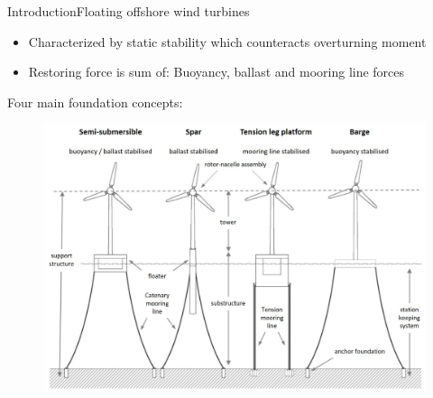 \begin{frame}{Introduction}{Floating offshore wind turbines}
	\begin{itemize}
		\item Characterized by static stability which counteracts overturning moment
		\item Restoring force is sum of: Buoyancy, ballast and mooring line forces
	\end{itemize}
	Four main foundation concepts:
	\begin{figure}[ht]
		\centering
		\includegraphics[width=.8\linewidth]{../Graphics/FloatingFoundationConcepts.jpg}
		\label{fig:floating_concepts}
	\end{figure}
\end{frame}


